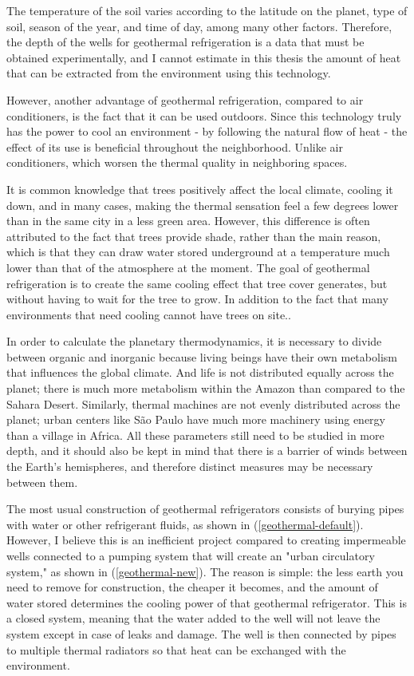 The temperature of the soil varies according to the latitude on the planet, type of soil, season of the year, and time of day, among many other factors. Therefore, the depth of the wells for geothermal refrigeration is a data that must be obtained experimentally, and I cannot estimate in this thesis the amount of heat that can be extracted from the environment using this technology.

However, another advantage of geothermal refrigeration, compared to air conditioners, is the fact that it can be used outdoors. Since this technology truly has the power to cool an environment - by following the natural flow of heat - the effect of its use is beneficial throughout the neighborhood. Unlike air conditioners, which worsen the thermal quality in neighboring spaces.

It is common knowledge that trees positively affect the local climate, cooling it down, and in many cases, making the thermal sensation feel a few degrees lower than in the same city in a less green area. However, this difference is often attributed to the fact that trees provide shade, rather than the main reason, which is that they can draw water stored underground at a temperature much lower than that of the atmosphere at the moment. The goal of geothermal refrigeration is to create the same cooling effect that tree cover generates, but without having to wait for the tree to grow. In addition to the fact that many environments that need cooling cannot have trees on site..

In order to calculate the planetary thermodynamics, it is necessary to divide between organic and inorganic because living beings have their own metabolism that influences the global climate. And life is not distributed equally across the planet; there is much more metabolism within the Amazon than compared to the Sahara Desert.
Similarly, thermal machines are not evenly distributed across the planet; urban centers like São Paulo have much more machinery using energy than a village in Africa. All these parameters still need to be studied in more depth, and it should also be kept in mind that there is a barrier of winds between the Earth's hemispheres, and therefore distinct measures may be necessary between them.

The most usual construction of geothermal refrigerators consists of burying pipes with water or other refrigerant fluids, as shown in (\autoref{geothermal-default}). However, I believe this is an inefficient project compared to creating impermeable wells connected to a pumping system that will create an "urban circulatory system," as shown in (\autoref{geothermal-new}). The reason is simple: the less earth you need to remove for construction, the cheaper it becomes, and the amount of water stored determines the cooling power of that geothermal refrigerator. This is a closed system, meaning that the water added to the well will not leave the system except in case of leaks and damage.
The well is then connected by pipes to multiple thermal radiators so that heat can be exchanged with the environment.


